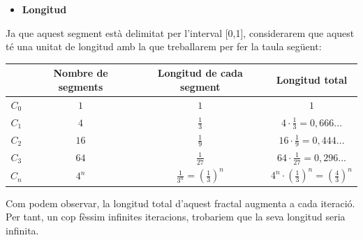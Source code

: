 \documentclass[12pt]{report}
\begin{document}
\begin{itemize}
\item \textbf{Longitud}
\end{itemize}
Ja que aquest segment està delimitat per l'interval [0,1], considerarem que aquest té una unitat de longitud amb la que treballarem per fer la taula següent:
\newline
\begin{tabular}{|c |c |c |c |}
\hline
& Nombre de segments & Longitud de cada segment & Longitud total \\
\hline

\newline
$C_0$ & $1$ & $1$ & $1$ \\[0,5cm]
\hline

$C_1$ & $4$ & $\frac{1}{3}$ & $4\cdot\frac{1}{3}=0,666...$ \\[0,5cm]
\hline

$C_2$ & $16$ & $\frac{1}{9}$ & $16\cdot\frac{1}{9}=0,444...$\\[0,5cm]
\hline

$C_3$ & $64$ & $\frac{1}{27}$ & $64\cdot\frac{1}{27}=0,296...$\\[0,5cm]
\hline
$C_n$ & $4^n$ & $\frac{1}{3^n}=(\frac{1}{3})^n$ & $4^n\cdot(\frac{1}{3})^n=(\frac{4}{3})^n$\\[0,5cm]
\hline
\end{tabular}
\newline
Com podem observar, la longitud total d'aquest fractal augmenta a cada iteració. Per tant, un cop fèssim infinites iteracions, trobariem que la seva longitud seria infinita.
\end{document}
